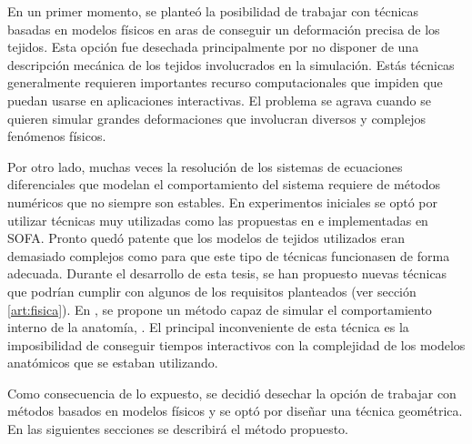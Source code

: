 En un primer momento, se planteó la posibilidad de trabajar con técnicas basadas en modelos físicos en aras de conseguir un deformación precisa de los tejidos. Esta opción fue desechada principalmente por no disponer de una descripción mecánica de los tejidos involucrados en la simulación. Estás técnicas generalmente requieren importantes recurso computacionales que impiden que puedan usarse en aplicaciones interactivas. El problema se agrava cuando se quieren simular grandes deformaciones que involucran diversos y complejos fenómenos físicos.

Por otro lado, muchas veces la resolución de los sistemas de ecuaciones diferenciales que modelan el comportamiento del sistema requiere de métodos numéricos que no siempre son estables. En experimentos iniciales se optó por utilizar técnicas muy utilizadas como las propuestas en  \cite{Muller2004} e implementadas en \ac{SOFA}. Pronto quedó patente que los modelos de tejidos utilizados eran demasiado complejos como para que este tipo de técnicas funcionasen de forma adecuada.
Durante el desarrollo de esta tesis, se han propuesto nuevas técnicas que podrían cumplir con algunos de los requisitos planteados (ver sección \ref{art:fisica}). En \cite{abu2015position}, se propone un método capaz de simular el comportamiento interno de la anatomía,   . El principal inconveniente de esta técnica es la imposibilidad de conseguir tiempos interactivos con la complejidad de los modelos anatómicos que se estaban utilizando. 

Como consecuencia de lo expuesto, se decidió desechar la opción de trabajar con métodos basados en modelos físicos y se optó por diseñar una técnica geométrica. En las siguientes secciones se describirá el método propuesto.